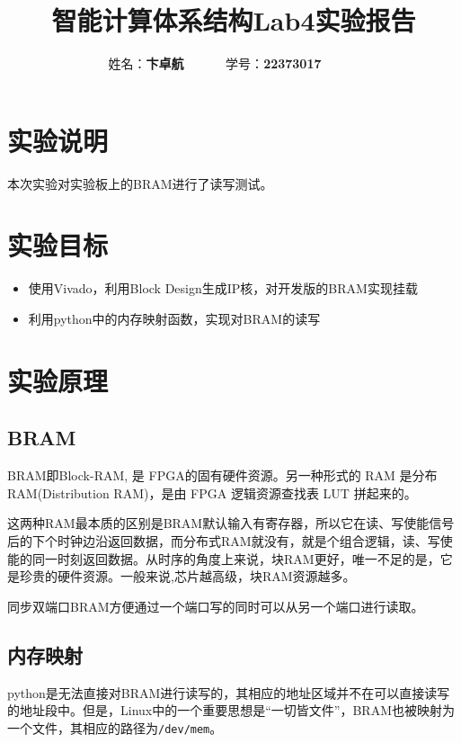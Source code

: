 \documentclass[12pt,a4paper]{article}
\begin{document}
\title{智能计算体系结构Lab4实验报告}
\date{}

\author{
姓名：\textbf{卞卓航}~~~~~~
学号：\textbf{22373017}~~~~~~
}

\maketitle

\section{实验说明}

本次实验对实验板上的BRAM进行了读写测试。

\section{实验目标}

\begin{itemize}
\item
  使用Vivado，利用Block Design生成IP核，对开发版的BRAM实现挂载
\item
  利用python中的内存映射函数，实现对BRAM的读写
\end{itemize}

\section{实验原理}

\subsection{BRAM}

BRAM即Block-RAM, 是 FPGA的固有硬件资源。另一种形式的 RAM 是分布RAM(Distribution RAM)，是由 FPGA 逻辑资源查找表 LUT 拼起来的。

这两种RAM最本质的区别是BRAM默认输入有寄存器，所以它在读、写使能信号后的下个时钟边沿返回数据，而分布式RAM就没有，就是个组合逻辑，读、写使能的同一时刻返回数据。从时序的角度上来说，块RAM更好，唯一不足的是，它是珍贵的硬件资源。一般来说,芯片越高级，块RAM资源越多。

同步双端口BRAM方便通过一个端口写的同时可以从另一个端口进行读取。

\subsection{内存映射}

python是无法直接对BRAM进行读写的，其相应的地址区域并不在可以直接读写的地址段中。但是，Linux中的一个重要思想是``一切皆文件''，BRAM也被映射为一个文件，其相应的路径为\texttt{/dev/mem}。
\end{document}
